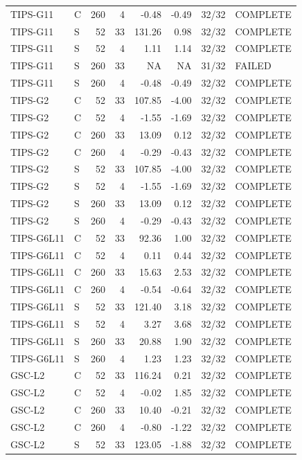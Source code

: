 \documentclass[10pt,a4paper]{article}
\begin{document}
\begin{longtable}{llrrrrrl}
TIPS-G11 & C & 260 & 4 & -0.48 & -0.49 & 32/32 & COMPLETE \\
TIPS-G11 & S & 52 & 33 & 131.26 & 0.98 & 32/32 & COMPLETE \\
TIPS-G11 & S & 52 & 4 & 1.11 & 1.14 & 32/32 & COMPLETE \\
TIPS-G11 & S & 260 & 33 & NA & NA & 31/32 & FAILED \\
TIPS-G11 & S & 260 & 4 & -0.48 & -0.49 & 32/32 & COMPLETE \\
TIPS-G2 & C & 52 & 33 & 107.85 & -4.00 & 32/32 & COMPLETE \\
TIPS-G2 & C & 52 & 4 & -1.55 & -1.69 & 32/32 & COMPLETE \\
TIPS-G2 & C & 260 & 33 & 13.09 & 0.12 & 32/32 & COMPLETE \\
TIPS-G2 & C & 260 & 4 & -0.29 & -0.43 & 32/32 & COMPLETE \\
TIPS-G2 & S & 52 & 33 & 107.85 & -4.00 & 32/32 & COMPLETE \\
TIPS-G2 & S & 52 & 4 & -1.55 & -1.69 & 32/32 & COMPLETE \\
TIPS-G2 & S & 260 & 33 & 13.09 & 0.12 & 32/32 & COMPLETE \\
TIPS-G2 & S & 260 & 4 & -0.29 & -0.43 & 32/32 & COMPLETE \\
TIPS-G6L11 & C & 52 & 33 & 92.36 & 1.00 & 32/32 & COMPLETE \\
TIPS-G6L11 & C & 52 & 4 & 0.11 & 0.44 & 32/32 & COMPLETE \\
TIPS-G6L11 & C & 260 & 33 & 15.63 & 2.53 & 32/32 & COMPLETE \\
TIPS-G6L11 & C & 260 & 4 & -0.54 & -0.64 & 32/32 & COMPLETE \\
TIPS-G6L11 & S & 52 & 33 & 121.40 & 3.18 & 32/32 & COMPLETE \\
TIPS-G6L11 & S & 52 & 4 & 3.27 & 3.68 & 32/32 & COMPLETE \\
TIPS-G6L11 & S & 260 & 33 & 20.88 & 1.90 & 32/32 & COMPLETE \\
TIPS-G6L11 & S & 260 & 4 & 1.23 & 1.23 & 32/32 & COMPLETE \\
GSC-L2 & C & 52 & 33 & 116.24 & 0.21 & 32/32 & COMPLETE \\
GSC-L2 & C & 52 & 4 & -0.02 & 1.85 & 32/32 & COMPLETE \\
GSC-L2 & C & 260 & 33 & 10.40 & -0.21 & 32/32 & COMPLETE \\
GSC-L2 & C & 260 & 4 & -0.80 & -1.22 & 32/32 & COMPLETE \\
GSC-L2 & S & 52 & 33 & 123.05 & -1.88 & 32/32 & COMPLETE \\

\end{longtable}
\end{document}
